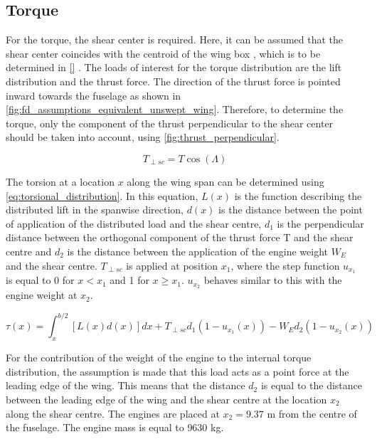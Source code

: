 \subsection*{Torque}
For the torque, the shear center is required. Here, it can be assumed that the shear center coincides with the centroid of the wing box \cite{Timmer2024AE2111-IReader}, which is to be determined in \autoref{} . The loads of interest for the torque distribution are the lift distribution and the thrust force. The direction of the thrust force is pointed inward towards the fuselage as shown in \autoref{fig:fd_assumptions_equivalent_unswept_wing}. Therefore, to determine the torque, only the component of the thrust perpendicular to the shear center should be taken into account, using \autoref{fig:thrust_perpendicular}. 

\begin{equation}
    \label{fig:thrust_perpendicular}
    T_{\perp sc} = T\cos(\Lambda)
\end{equation}

\noindent The torsion at a location $x$ along the wing span can be determined using \autoref{eq:torsional_distribution}. In this equation, $L(x)$ is the function describing the distributed lift in the spanwise direction, $d(x)$ is the distance between the point of application of the distributed load and the shear centre, $d_1$ is the perpendicular distance between the orthogonal component of the thrust force T and the shear centre and $d_2$ is the distance between the application of the engine weight $W_E$ and the shear centre. $T_{\perp sc}$ is applied at position $x_1$, where the step function $u_{x_1}$ is equal to 0 for $x<x_1$ and 1 for $x\geq x_1$. $u_{x_2}$ behaves similar to this with the engine weight at $x_2$.

\begin{equation}
    \tau(x) = \int_x^{b/2}[L(x)d(x)]dx + T_{\perp sc}d_1 \left(1 - u_{x_1}(x) \right) - W_Ed_2\left(1 - u_{x_2}(x) \right)
    \label{eq:torsional_distribution}
\end{equation}

\noindent For the contribution of the weight of the engine to the internal torque distribution, the assumption is made that this load acts as a point force at the leading edge of the wing. This means that the distance $d_2$ is equal to the distance between the leading edge of the wing and the shear centre at the location $x_2$ along the shear centre. The engines are placed at $x_2 = 9.37$ m from the centre of the fuselage. The engine mass is equal to $9630$ kg. \\

